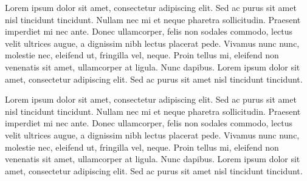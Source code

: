 \documentclass[a4paper]{article}
\begin{document}
\noindent
Lorem ipsum dolor sit amet, consectetur adipiscing elit. Sed ac purus sit amet
nisl tincidunt tincidunt. Nullam nec mi et neque pharetra sollicitudin. Praesent
imperdiet mi nec ante. Donec ullamcorper, felis non sodales commodo, lectus velit
ultrices augue, a dignissim nibh lectus placerat pede. Vivamus nunc nunc, molestie
nec, eleifend ut, fringilla vel, neque. Proin tellus mi, eleifend non venenatis
sit amet, ullamcorper at ligula. Nunc dapibus. Lorem ipsum dolor sit amet,
consectetur adipiscing elit. Sed ac purus sit amet nisl tincidunt tincidunt.

\begin{figure}[H]
  \centering
  \caption{}
  \label{}
\end{figure}

\noindent
Lorem ipsum dolor sit amet, consectetur adipiscing elit. Sed ac purus sit amet
nisl tincidunt tincidunt. Nullam nec mi et neque pharetra sollicitudin. Praesent
imperdiet mi nec ante. Donec ullamcorper, felis non sodales commodo, lectus velit
ultrices augue, a dignissim nibh lectus placerat pede. Vivamus nunc nunc, molestie
nec, eleifend ut, fringilla vel, neque. Proin tellus mi, eleifend non venenatis
sit amet, ullamcorper at ligula. Nunc dapibus. Lorem ipsum dolor sit amet,
consectetur adipiscing elit. Sed ac purus sit amet nisl tincidunt tincidunt.
\end{document}
